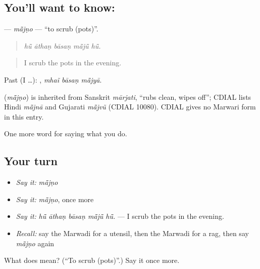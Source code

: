 \subsection*{You'll want to know: }
\textbf{} — \emph{mā̃jṇo} — \textquotedblleft{}to scrub (pots)\textquotedblright{}.

\begin{quote}
    
\end{quote}

\begin{quote}
\emph{hū̃ āthaṇ bāsaṇ mā̃jū̃ hū̃.}
\end{quote}

\begin{quote}
I scrub the pots in the evening.
\end{quote}

Past (I …):   , \emph{mhaĩ bāsaṇ mā̃jyā}.

\begin{cousinweb}
\textbf{} (\emph{mā̃jṇo}) is inherited from Sanskrit \emph{mārjati}, \textquotedblleft{}rubs clean, wipes off\textquotedblright{}; CDIAL lists Hindi \emph{mā̃jnā} and Gujarati \emph{mā̃jvũ} (CDIAL 10080). CDIAL gives no Marwari form in this entry.
\end{cousinweb}

\begin{grammarlens}[title={What you've built}]
One more word for saying what you do.
\end{grammarlens}

\subsection*{Your turn}
\begin{itemize}
\raggedright
  \item \emph{Say it:} \emph{mā̃jṇo}
  \item \emph{Say it:} \emph{mā̃jṇo}, once more
  \item \emph{Say it:} \emph{hū̃ āthaṇ bāsaṇ mā̃jū̃ hū̃.} — I scrub the pots in the evening.
  \item \emph{Recall:} say the Marwadi for a utensil, then the Marwadi for a rag, then say \emph{mā̃jṇo} again
\end{itemize}

\begin{tcolorbox}[breakable,colback=teal!4,colframe=teal!35!black,title={Before you move on}]
What does  mean? (\textquotedblleft{}To scrub (pots)\textquotedblright{}.) Say it once more.
\end{tcolorbox}
